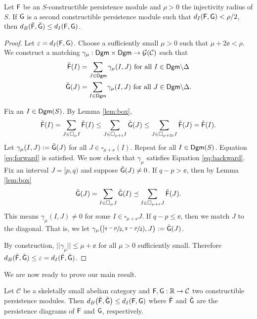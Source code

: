 \documentclass[12pt]{article}
\begin{document}
\begin{lem}
\label{lem:bijection}
Let ${\mathsf{F}}$ be an $S$-constructible persistence module and $\rho > 0$ the injectivity 
radius of $S$.
If ${\mathsf{G}}$ is a second constructible persistence module such that $d_I({\mathsf{F}},{\mathsf{G}}) < \rho/2$, then 
$d_B(\tilde {{\mathsf{F}}}, \tilde {{\mathsf{G}}}) \leq d_I({\mathsf{F}},{\mathsf{G}})$.
\end{lem}

\begin{proof}
Let $\varepsilon = d_I ({\mathsf{F}}, {\mathsf{G}})$.
Choose a sufficiently small $\mu > 0$ such that $\mu + 2 \ee < \rho$.
We construct a matching $\gamma_\mu : {\mathsf{Dgm}} \times {\mathsf{Dgm}} \to {\mathcal{G}}({\mathcal{C}})$ such that
	\begin{align}
	\tilde {{\mathsf{F}}}(I) & = \sum_{J \in {\mathsf{Dgm}}} \gamma_\mu(I,J) \textrm{ for all }I \in {\mathsf{Dgm}} \backslash \Delta 
	\label{eq:forward} \\
	\tilde {{\mathsf{G}}}(J) & = \sum_{I \in {\mathsf{Dgm}}} \gamma_\mu(I,J) \textrm{ for all } J \in {\mathsf{Dgm}} \backslash \Delta 
	\label{eq:backward} .
	\end{align}

Fix an  $I \in {\mathsf{Dgm}}(S)$. 
By Lemma \ref{lem:box}, 
$$\tilde {{\mathsf{F}}}(I) = \sum_{J \in \square_{\mu} I} \tilde {{\mathsf{F}}} (I) \leq \sum_{J \in \square_{\mu + \varepsilon} I} \tilde {{\mathsf{G}}}(J) \leq \sum_{J \in \square_{\mu + 2\varepsilon} I}\tilde {{\mathsf{F}}}(J) = \tilde {{\mathsf{F}}}(I).$$ 
Let $\gamma_\mu(I,J) := \tilde {{\mathsf{G}}}(J)$ for all $J \in \square_{\mu + \ee}(I)$.
Repeat for all $I \in {\mathsf{Dgm}}(S)$.
Equation \ref{eq:forward} is satisfied.
We now check that $\gamma_\mu$ satisfies Equation \ref{eq:backward}.
Fix an interval $J = [p,q)$ and suppose $\tilde {{\mathsf{G}}} (J) \neq 0$.
If $q-p > \ee$, then by Lemma \ref{lem:box}
	$$\tilde {{\mathsf{G}}}(J) = \sum_{I \in \square_{\mu} J} \tilde {{\mathsf{G}}} (I) \preceq \sum_{I \in \square_{\mu+\varepsilon} J} 
	\tilde {{\mathsf{F}}}(J).$$
This means $\gamma_\mu(I, J) \neq 0$ for some $I \in \square_{\mu+\ee} J$.
If $q-p \leq \ee$, then we match $J$ to the diagonal. 
That is, we let $\gamma_\mu \big ( [\sfrac{q-p}{2}, \sfrac{q-p}{2} ), J \big) := \tilde {{\mathsf{G}}}(J)$.

By construction, $||\gamma_\mu|| \leq \mu + \ee $ for all $\mu > 0$ sufficiently small. Therefore $d_B ( \tilde {{\mathsf{F}}}, \tilde {{\mathsf{G}}} ) \leq \varepsilon = d_I(\tilde {{\mathsf{F}}}, \tilde {{\mathsf{G}}})$. 
\end{proof}

We are now ready to prove our main result.

\begin{thm}
Let $\mathcal{C}$ be a skeletally small abelian category and ${\mathsf{F}}, {\mathsf{G}}:  {\mathbb R} \to \mathcal{C}$ 
two constructible persistence modules.
Then $d_B \big( \tilde {{\mathsf{F}}}, \tilde {{\mathsf{G}}} \big) \leq d_I ({\mathsf{F}}, {\mathsf{G}})$
where $\tilde {{\mathsf{F}}}$ and $\tilde {{\mathsf{G}}}$ are the persistence diagrams of ${\mathsf{F}}$ and ${\mathsf{G}}$,
respectively.
\end{thm}
\end{document}
